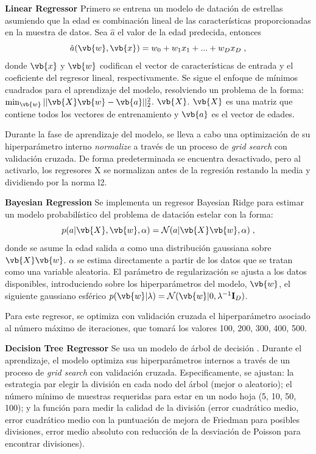 \textbf{Linear Regressor} {} Primero se entrena un modelo de datación de estrellas asumiendo que la edad es combinación lineal de las características proporcionadas en la muestra de datos. Sea $\hat{a}$ el valor de la edad predecida, entonces
\begin{equation}
\hat{a}(\vb{w}, \vb{x}) = w_0 + w_1 x_1 + ... + w_D x_D \; ,
\end{equation}
donde $\vb{x}$ y $\vb{w}$ codifican el vector de características de entrada y el coeficiente del regresor lineal, respectivamente. Se sigue el enfoque de mínimos cuadrados para el aprendizaje del modelo, resolviendo un problema de la forma: $\min_{\vb{w}} || \vb{X} \vb{w} - \vb{a}||_2^2$. $\vb{X}$. $\vb{X}$ es una matriz que contiene todos los vectores de entrenamiento y $\vb{a}$ es el vector de edades. 

Durante la fase de aprendizaje del modelo, se lleva a cabo una optimización de su hiperparámetro interno \emph{normalize} a través de un proceso de \emph{grid search} con validación cruzada. De forma predeterminada se encuentra desactivado, pero al activarlo, los regresores X se normalizan antes de la regresión restando la media y dividiendo por la norma l2.

\vspace{0.5cm}

\textbf{Bayesian Regression} {} Se implementa un regresor Bayesian Ridge para estimar un modelo probabilístico del problema de datación estelar con la forma:
\begin{equation}
p(a|\vb{X},\vb{w},\alpha) = \mathcal{N}(a|\vb{X} \vb{w},\alpha)\; ,
\end{equation}
donde se asume la edad salida $a$ como una distribución gaussiana sobre $\vb{X}\vb{w}$. $\alpha$ se estima directamente a partir de los datos que se tratan como una variable aleatoria. El parámetro de regularización se ajusta a los datos disponibles, introduciendo sobre los hiperparámetros del modelo, \ie $\vb{w}$, el siguiente gaussiano esférico $p(\vb{w}|\lambda) =
\mathcal{N}(\vb{w}|0,\lambda^{-1}\mathbf{I}_{D})$.

Para este regresor, se optimiza con validación cruzada el hiperparámetro asociado al número máximo de iteraciones, que tomará los valores 100, 200, 300, 400, 500.

\vspace{0.5cm}

\textbf{Decision Tree Regressor} {} Se usa un modelo de árbol de decisión \cite{Breiman1984}. %
Durante el aprendizaje, el modelo optimiza sus hiperparámetros internos a través de un proceso de \emph{grid search} con validación cruzada. Especificamente, se ajustan: la estrategia par elegir la división en cada nodo del árbol (mejor o aleatorio); el número mínimo de muestras requeridas para estar en un nodo hoja (5, 10, 50, 100); y la función para medir la calidad de la división (error cuadrático medio, error cuadrático medio con la puntuación de mejora de Friedman para posibles divisiones, error medio absoluto con reducción de la desviación de Poisson para encontrar divisiones). 

